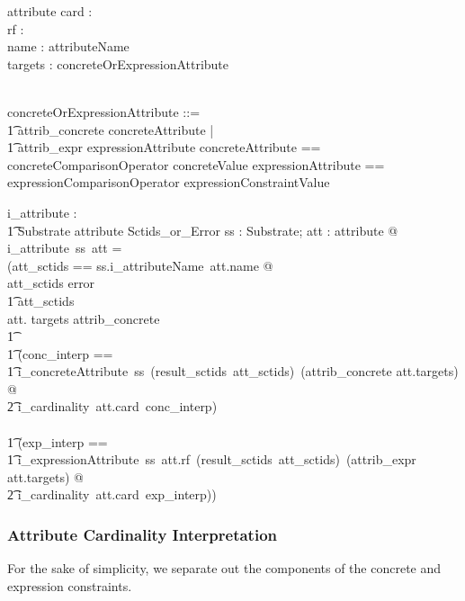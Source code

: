 \documentclass{article}
\begin{document}
\begin{schema}{attribute}
   card : \optional[cardinality] \\
   rf : \optional[reverseFlag] \\
   name : attributeName \\
   targets : concreteOrExpressionAttribute
\end{schema}

\begin{zed}
[reverseFlag] \\
concreteOrExpressionAttribute ::= \\
\t1 attrib\_concrete \ldata concreteAttribute \rdata | \\
\t1 attrib\_expr \ldata expressionAttribute \rdata
\also
concreteAttribute == concreteComparisonOperator \cross concreteValue
\also
expressionAttribute == expressionComparisonOperator \cross expressionConstraintValue
\end{zed}

\begin{gendef}
   i\_attribute : \\
\t1 Substrate  \fun attribute \fun Sctids\_or\_Error
\where
   \forall ss : Substrate; att : attribute @ \\
   i\_attribute~ss~att = \\
   (\LET att\_sctids == ss.i\_attributeName~att.name @ \\
   \IF att\_sctids \in \ran error \\
\t1 \THEN att\_sctids \\
   \ELSE \IF att. targets \in \ran attrib\_concrete \\
\t1 \THEN \\
\t1 (\LET conc\_interp == \\
\t1 i\_concreteAttribute~ss~(result\_sctids~att\_sctids)~(attrib\_concrete \inv att.targets) @ \\
\t2 i\_cardinality~att.card~conc\_interp) \\
   \ELSE  \\
\t1 (\LET exp\_interp == \\
\t1 i\_expressionAttribute~ss~att.rf~(result\_sctids~att\_sctids)~(attrib\_expr \inv att.targets) @ \\
\t2 i\_cardinality~att.card~exp\_interp))
\end{gendef}


\subsubsection{Attribute Cardinality Interpretation}
For the sake of simplicity, we separate out the components of the concrete and expression constraints.
\end{document}
